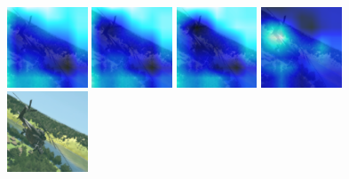 \begin{figure}[H]
\centering
{}
  {\includegraphics[height=2.4cm, width=2.4cm]{images/vbs3/gradcam/5-5/1/Heat_map_of_iterations_0.png}}
  {\includegraphics[height=2.4cm, width=2.4cm]{images/vbs3/gradcam/5-5/1/Heat_map_of_iterations_1.png}}
  {\includegraphics[height=2.4cm, width=2.4cm]{images/vbs3/gradcam/5-5/1/Heat_map_of_iterations_3.png}}
%
  {\includegraphics[height=2.4cm, width=2.4cm]{images/vbs3/gradcam/5-5/1/Heat_map_of_iterations_5.png}}
  {\includegraphics[height=2.4cm, width=2.4cm]{images/vbs3/gradcam/5-5/1/Test_Images.png}}



\end{figure}
